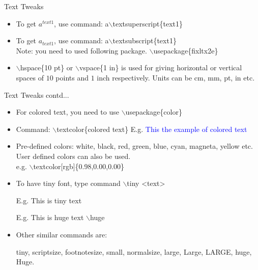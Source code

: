 \documentclass [9pt] {beamer}
\begin{document}
\begin{frame}{Text Tweaks}
\begin{itemize}
	\item To get $a^{text1}$, use command: a$\backslash$textsuperscript\{text1\}\\[0.3cm]
	\item To get $a_{text1}$, use command: a$\backslash$textsubscript\{text1\}\\[0.3cm]
	
	Note: you need to used following package. $\backslash$usepackage\{fixltx2e\}
	
	\item $\backslash$hspace\{10 pt\} or $\backslash$vspace\{1 in\} is used for giving horizontal or vertical spaces of $10$ points and $1$ inch respectively. Units can be cm, mm, pt, in etc.
\end{itemize}
\end{frame}

\begin{frame}{Text Tweaks contd...}
\begin{itemize}
	\item For colored text, you need to use $\backslash$usepackage\{color\}\\[0.4cm]
	\item Command: \textcolor[rgb]{0.98,0.00,0.00}{$\backslash$textcolor\{colored text\}}  E.g. \textcolor{blue}{This the example of colored text} \\[0.4cm]
	\item Pre-defined colors: white, black, red, green, blue, cyan, magneta, yellow etc. User defined colors can also be used. \\ e.g. \textcolor[rgb]{0.98,0.00,0.00}{$\backslash$textcolor[rgb]\{0.98,0.00,0.00\}} \\[0.4cm]
	\item To have tiny font, type command \textcolor[rgb]{0.98,0.00,0.00}{$\backslash$tiny} \textless text\textgreater
	
	E.g. \tiny This is tiny text
	
	E.g. \huge This is huge text
	\normalsize \textcolor[rgb]{0.98,0.00,0.00}{$\backslash$huge}
	
	\item Other similar commands are: 
	
	tiny, scriptsize, footnotesize, small, normalsize, large, Large, LARGE, huge, Huge.
	
\end{itemize}
\end{frame}
\end{document}
